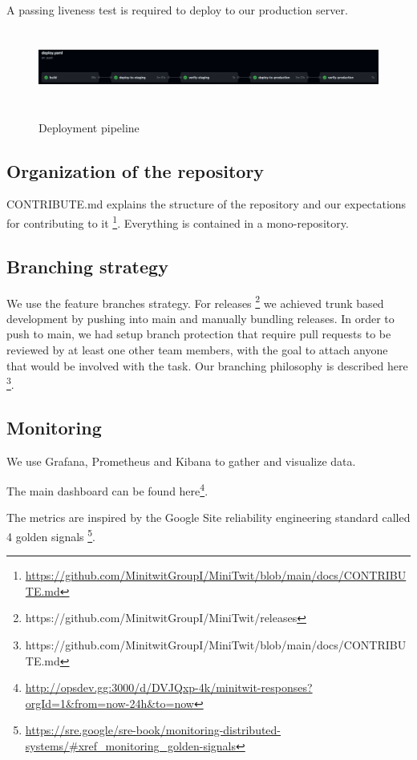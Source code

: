 \documentclass{article}
\begin{document}
A passing liveness test is required to deploy to our production server. 

\begin{figure}[h]
    \includegraphics[width=1\textwidth, height=2.5cm]{images/Deploy_Pipeline.png}
    \label{fig:cd_pipeline}
    \caption{Deployment pipeline}
    \centering
\end{figure}

\subsection{Organization of the repository}

CONTRIBUTE.md explains the structure of the repository and our expectations for contributing to it \footnote{\url{https://github.com/MinitwitGroupI/MiniTwit/blob/main/docs/CONTRIBUTE.md}}. Everything is contained in a mono-repository.

\subsection{Branching strategy}

We use the feature branches strategy. For releases \footnote{https://github.com/MinitwitGroupI/MiniTwit/releases} we achieved trunk based development by pushing into main and manually bundling releases. In order to push to main, we had setup branch protection that require pull requests to be reviewed by at least one other team members, with the goal to attach anyone that would be involved with the task. Our branching philosophy is described here \footnote{https://github.com/MinitwitGroupI/MiniTwit/blob/main/docs/CONTRIBUTE.md}.

\subsection{Monitoring}

We use Grafana, Prometheus and Kibana to gather and visualize data.

The main dashboard can be found here\footnote{\url{http://opsdev.gg:3000/d/DVJQxp-4k/minitwit-responses?orgId=1&from=now-24h&to=now}}.

The metrics are inspired by the Google Site reliability engineering standard called 4 golden signals \footnote{\url{https://sre.google/sre-book/monitoring-distributed-systems/\#xref_monitoring_golden-signals}}.
\end{document}
